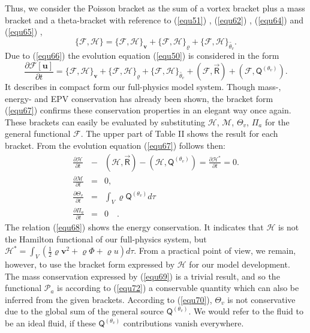 Thus, we consider the Poisson bracket as the sum of a vortex bracket plus a mass bracket and a theta-bracket with reference to (\ref{equ51}) , (\ref{equ62}) , (\ref{equ64}) and (\ref{equ65}) , 
\begin{equation}
\lbrace \mathcal{F}, \mathcal{H}\rbrace =
\lbrace \mathcal{F}, \mathcal{H}\rbrace_{\mathbf{v}} +
\lbrace \mathcal{F}, \mathcal{H}\rbrace_{\varrho} +
\lbrace \mathcal{F}, \mathcal{H}\rbrace_{\tilde{\theta_v}}.
\label{equ66}
\end{equation}
Due to (\ref{equ66}) the evolution equation (\ref{equ50}) is considered in the form
\begin{equation}
\frac{\partial \mathcal{F}[\mathbf{u}]}{\partial t} = \lbrace\mathcal{F},\mathcal{H}\rbrace_{\mathbf{v}} +
\lbrace\mathcal{F},\mathcal{H}\rbrace_{\varrho} +
\lbrace\mathcal{F},\mathcal{H}\rbrace_{\tilde{\theta_v}}
+(\mathcal{F},\vec{\mathsf{R}}) + (\mathcal{F}, \mathsf{Q}^{( \theta_v)}).\label{equ67}
\end{equation}
It describes in compact form our full-physics model system. Though mass-, energy- and EPV conservation has already been shown, the bracket form (\ref{equ67}) confirms these conservation properties  in an elegant way once again. These brackets can easily be evaluated by substituting $\mathcal{H}$, $\mathcal{M}$, $\Theta_v$, $\Pi_a$ for the general functional $\mathcal{F}$.
The upper part of
Table II shows the result for each bracket. From the evolution equation (\ref{equ67}) follows then:
\begin{eqnarray}
\frac{\partial \mathcal{H}}{\partial t} &-& \left(\mathcal{H} , \vec{\mathsf{R}} \right) - \left( \mathcal{H} , \mathsf{Q}^{\left( \theta_v\right)} \right)  = \frac{\partial \mathcal{H^*}}{\partial t} = 0 .
\label{equ68}\\
\frac{\partial\mathcal{M} }{\partial t} &=& 0 ,\label{equ69}\\
\frac{\partial \Theta_v}{\partial t}&=& \int_V \varrho \mathsf{Q}^{\left( \theta_v\right)} d\tau \label{equ70}\\
\frac{\partial \Pi_a}{\partial t}&=& 0 \quad .\label{equ72}
\end{eqnarray} 
The relation (\ref{equ68}) shows the energy conservation. It indicates that $\mathcal{H}$ is not the Hamilton functional of our full-physics system, but $\mathcal{H^*} = \int_V \left( \frac{1}{2}\varrho \mathbf{v}^2 + \varrho \Phi + \varrho u \right)d\tau $. From a practical point of view, we remain, however, to use the bracket form expressed by $\mathcal{H}$ for our model development. The mass conservation expressed by (\ref{equ69}) is a trivial result, and so the functional $\mathcal{P}_a$ is according to (\ref{equ72}) a conservable quantity which can also be inferred from the given brackets. According to (\ref{equ70}), $\Theta_v$ is not conservative due to the global sum of the general source $\mathsf{Q}^{\left( \theta_v\right)}$. We would refer to the fluid to be an ideal fluid, if these $\mathsf{Q}^{\left( \theta_v\right)}$ contributions vanish everywhere. 


